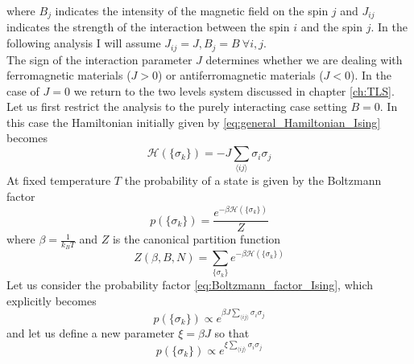 where $B_j$ indicates the intensity of the magnetic field on the spin $j$ and $J_{ij}$ indicates the strength of the interaction between the spin $i$ and the spin $j$.
In the following analysis I will assume $J_{ij} = J, B_j = B \ \forall i,j$. \\
The sign of the interaction parameter $J$ determines whether we are dealing with ferromagnetic materials ($J>0$) or antiferromagnetic materials ($J < 0$). In the case of $J=0$
we return to the two levels system discussed in chapter \ref{ch:TLS}. \\
Let us first restrict the analysis to the purely interacting case setting $B=0$. In this case the Hamiltonian initially given by \ref{eq:general_Hamiltonian_Ising} becomes
\begin{equation*}
    \mathcal{H}(\{\sigma_k\}) = -J \sum_{\langle i j\rangle}\sigma_{i} \sigma_{j}
\end{equation*}
At fixed temperature $T$ the probability of a state is given by the Boltzmann factor
\begin{equation}
    p(\{\sigma_k\}) = \frac{e^{-\beta\mathcal{H}(\{\sigma_k\})}}{Z}
    \label{eq:Boltzmann_factor_Ising}
\end{equation}
where $\beta = \frac{1}{k_BT}$ and $Z$ is the canonical partition function
\begin{equation*}
    Z(\beta, B, N) = \sum_{\{\sigma_k\}} e^{-\beta\mathcal{H}(\{\sigma_k\})}
\end{equation*}
Let us consider the probability factor \ref{eq:Boltzmann_factor_Ising}, which explicitly becomes 
\begin{equation*}
    p(\{\sigma_k\}) \propto e^{\beta J \sum_{\langle i j\rangle}\sigma_{i} \sigma_{j}}
\end{equation*}
and let us define a new parameter $\xi = \beta J$ so that 
\begin{equation}
    p(\{\sigma_k\}) \propto e^{\xi \sum_{\langle i j\rangle}\sigma_{i} \sigma_{j}}
    \label{eq:probability_Ising}
\end{equation}

